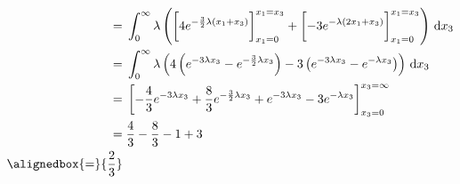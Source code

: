 \documentclass[hwnumber=3]{mthe353answer}
\begin{document}
\begin{questions}
\begin{parts}
\begin{solution}
\begin{align*}
          =&\; \int_0^\infty \lambda\left(\biggl[4e^{-\frac{3}{2}\lambda(x_1+x_3)}\biggr]_{x_1=0}^{x_1=x_3}
            + \biggl[-3e^{-\lambda(2x_1+x_3)}\biggr]_{x_1=0}^{x_1=x_3}\right)
            \, \textrm{d}x_3\\
          =&\; \int_0^\infty \lambda\left(4\left(e^{-3\lambda x_3} - e^{-\frac{3}{2}\lambda x_3}\right)
            - 3\left(e^{-3\lambda x_3} - e^{-\lambda x_3}\right)\right)
            \, \textrm{d}x_3\\
          =&\; \left[-\frac{4}{3}e^{-3\lambda x_3} + \frac{8}{3}e^{-\frac{3}{2}\lambda x_3}
            + e^{-3\lambda x_3} -3e^{-\lambda x_3}\right]_{x_3=0}^{x_3=\infty}\\
          =&\; \frac{4}{3} - \frac{8}{3} - 1 + 3\\
          \alignedbox{=}{\frac{2}{3}}
        \end{align*}
      \end{solution}
    \end{parts}
  \end{questions}
\end{document}
